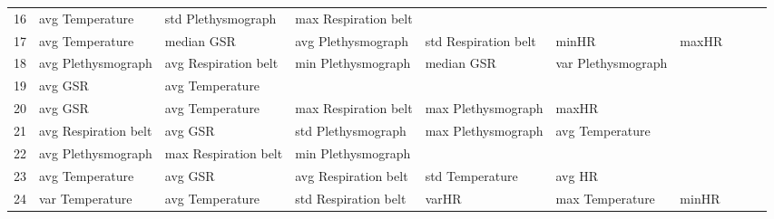 \begin{landscape}
\begin{table}[]
\begin{tabular}{l|llllllll}
16       & avg Temperature         & std Plethysmograph      & max Respiration belt    &                         &                         &                       &                         &                         &                         &         \\
17       & avg Temperature         & median GSR              & avg Plethysmograph      & std Respiration belt    & minHR                   & maxHR                 &                         &                         &                         &         \\
18       & avg Plethysmograph      & avg Respiration belt    & min Plethysmograph      & median GSR              & var Plethysmograph      &                       &                         &                         &                         &         \\
19       & avg GSR                 & avg Temperature         &                         &                         &                         &                       &                         &                         &                         &         \\
20       & avg GSR                 & avg Temperature         & max Respiration belt    & max Plethysmograph      & maxHR                   &                       &                         &                         &                         &         \\
21       & avg Respiration belt    & avg GSR                 & std Plethysmograph      & max Plethysmograph      & avg Temperature         &                       &                         &                         &                         &         \\
22       & avg Plethysmograph      & max Respiration belt    & min Plethysmograph      &                         &                         &                       &                         &                         &                         &         \\
23       & avg Temperature         & avg GSR                 & avg Respiration belt    & std Temperature         & avg HR                  &                       &                         &                         &                         &         \\
24       & var Temperature         & avg Temperature         & std Respiration belt    & varHR                   & max Temperature         & minHR                 &                         &                         &                         &         \\

\end{tabular}
\end{table}
\end{landscape}
